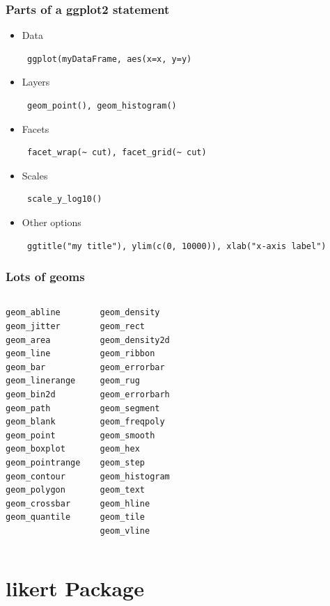 \documentclass[10pt,slidestop,mathserif,c]{beamer}
\begin{document}
\begin{frame}
	\frametitle{Parts of a ggplot2 statement}
	\begin{itemize}
		\item<+-| alert@+> Data \begin{verbatim} ggplot(myDataFrame, aes(x=x, y=y) \end{verbatim}
		\item<+-| alert@+> Layers \begin{verbatim} geom_point(), geom_histogram() \end{verbatim}
		\item<+-| alert@+> Facets \begin{verbatim} facet_wrap(~ cut), facet_grid(~ cut) \end{verbatim}
		\item<+-| alert@+> Scales \begin{verbatim} scale_y_log10() \end{verbatim}
		\item<+-| alert@+> Other options \begin{verbatim} ggtitle("my title"), ylim(c(0, 10000)), xlab("x-axis label") \end{verbatim}
	\end{itemize}
\end{frame}

\begin{frame}
	\frametitle{Lots of geoms}
	\begin{columns}[c]
	\column{1.5in}
\begin{verbatim} 
geom_abline
geom_jitter
geom_area
geom_line
geom_bar	
geom_linerange
geom_bin2d
geom_path 
geom_blank
geom_point 
geom_boxplot
geom_pointrange 
geom_contour
geom_polygon 
geom_crossbar
geom_quantile 
\end{verbatim}
\column{1.5in}
\begin{verbatim}
geom_density
geom_rect 
geom_density2d
geom_ribbon
geom_errorbar
geom_rug
geom_errorbarh
geom_segment 
geom_freqpoly
geom_smooth 
geom_hex
geom_step
geom_histogram
geom_text 
geom_hline
geom_tile
geom_vline
\end{verbatim}
\end{columns}
\end{frame}

\section{likert Package}
\end{document}
